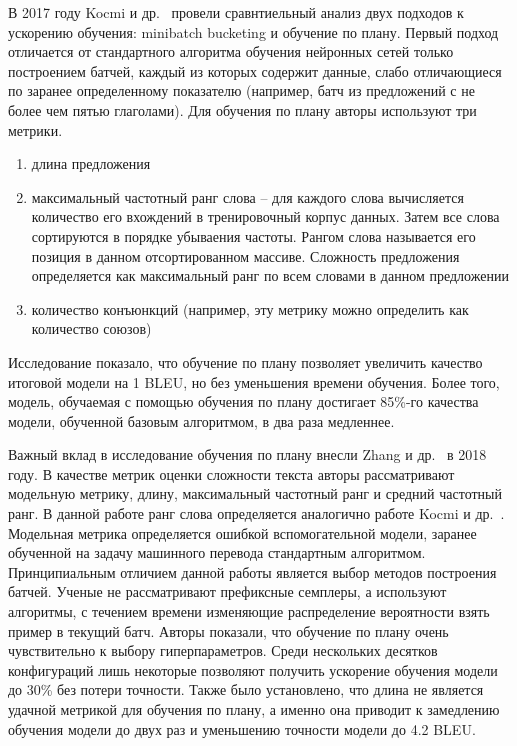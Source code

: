 \documentclass{spbau-diploma}
\begin{document}
В 2017 году Kocmi и др.~\cite{kocmi2017curriculum} провели сравнтиельный анализ двух подходов к ускорению обучения: minibatch bucketing и обучение по плану. Первый подход отличается от стандартного алгоритма обучения нейронных сетей только построением батчей, каждый из которых содержит данные, слабо отличающиеся по заранее определенному показателю (например, батч из предложений с не более чем пятью глаголами). Для обучения по плану авторы используют три метрики.
\begin{enumerate}
	\item длина предложения
	\item максимальный частотный ранг слова -- для каждого слова вычисляется количество его вхождений в тренировочный корпус данных. Затем все слова сортируются в порядке убываения частоты. Рангом слова называется его позиция в данном отсортированном массиве. Сложность предложения определяется как максимальный ранг по всем словами в данном предложении
	\item количество конъюнкций (например, эту метрику можно определить как количество союзов)
\end{enumerate}

Исследование показало, что обучение по плану позволяет увеличить качество итоговой модели на 1 BLEU, но без уменьшения времени обучения. Более того, модель, обучаемая с помощью обучения по плану достигает 85\%-го качества модели, обученной базовым алгоритмом, в два раза медленнее.

Важный вклад в исследование обучения по плану внесли Zhang и др.~\cite{zhang2018empirical} в 2018 году. В качестве метрик оценки сложности текста авторы рассматривают модельную метрику, длину, максимальный частотный ранг и средний частотный ранг. В данной работе ранг слова определяется аналогично работе Kocmi и др.~\cite{kocmi2017curriculum}. Модельная метрика определяется ошибкой вспомогательной модели, заранее обученной на задачу машинного перевода стандартным алгоритмом. Принципиальным отличием данной работы является выбор методов построения батчей. Ученые не рассматривают префиксные семплеры, а используют алгоритмы, с течением времени изменяющие распределение вероятности взять пример в текущий батч. Авторы показали, что обучение по плану очень чувствительно к выбору гиперпараметров. Среди нескольких десятков конфигураций лишь некоторые позволяют получить ускорение обучения модели до 30\% без потери точности. Также было установлено, что длина не является удачной метрикой для обучения по плану, а именно она приводит к замедлению обучения модели до двух раз и уменьшению точности модели до 4.2 BLEU.
\end{document}
